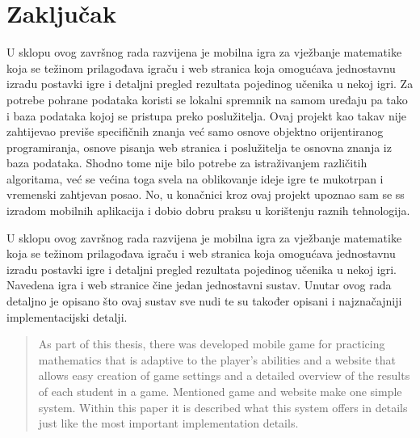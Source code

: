 \documentclass[times, utf8, zavrsni, numeric]{fer}
\begin{document}
\chapter{Zaključak}
U sklopu ovog završnog rada razvijena je mobilna igra za vježbanje matematike koja se težinom prilagođava igraču  i web stranica koja omogućava jednostavnu izradu
postavki igre i detaljni pregled rezultata pojedinog učenika u nekoj igri. Za potrebe pohrane podataka koristi se lokalni spremnik na samom uređaju pa tako i baza podataka kojoj se pristupa preko poslužitelja.
Ovaj projekt kao takav nije zahtijevao previše specifičnih znanja već samo osnove objektno orijentiranog programiranja, osnove pisanja web stranica i poslužitelja te osnovna znanja iz baza podataka. Shodno tome nije bilo 
potrebe za istraživanjem različitih algoritama, već se većina toga svela na oblikovanje ideje igre te mukotrpan i vremenski zahtjevan posao. No, u konačnici kroz ovaj projekt upoznao sam se ss izradom mobilnih aplikacija 
i dobio dobru praksu u korištenju raznih tehnologija.





\begin{sazetak}
U sklopu ovog završnog rada razvijena je mobilna igra za vježbanje matematike koja se težinom prilagođava igraču  i web stranica koja omogućava jednostavnu izradu
postavki igre i detaljni pregled rezultata pojedinog učenika u nekoj igri. Navedena igra i web stranice čine jedan jednostavni sustav. Unutar ovog rada detaljno je opisano što ovaj sustav sve nudi te su također opisani
i najznačajniji implementacijski detalji.

\end{sazetak}

\begin{abstract}
As part of this thesis, there was developed mobile game for practicing mathematics that is adaptive to the player's abilities and a website that allows easy creation of game settings and a detailed overview of
the results of each student in a game. Mentioned game and website make one simple system. Within this paper it is described what this system offers in details just like the most important implementation details.

\end{abstract}
\end{document}
